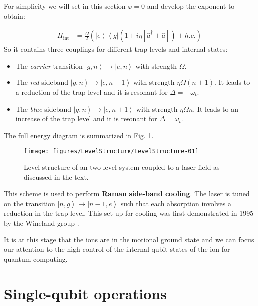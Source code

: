 \documentclass[10pt]{article}
\let\cite\citep
\providecommand\citep{\cite}
\newcommand{\bra}[1]{\ensuremath{\left\langle#1\right|}}
\newcommand{\ket}[1]{\ensuremath{\left|#1\right\rangle}}
\begin{document}
For simplicity we will set in this section $\varphi=0$ and develop the exponent to obtain:

\begin{align}
H_\textrm{int} &= \frac{\Omega}{2}\left(\ket{e}\bra{g}\left(1 + i\eta[\hat{a}^\dag+ \hat{a}]\right) + h.c.\right)
\end{align}
So it contains three couplings for different trap levels and internal states:
\begin{itemize}
\item The \textit{carrier} transition $\ket{g,n}\rightarrow \ket{e,n}$ with strength $\Omega$.
\item The \textit{red} sideband $\ket{g,n}\rightarrow \ket{e,n-1}$ with strength $\eta \Omega(n+1)$. It leads to a reduction of the trap level and it is resonant for $\Delta = -\omega_t$.
\item The \textit{blue} sideband $\ket{g,n}\rightarrow \ket{e,n+1}$ with strength $\eta \Omega n$. It leads to an increase of the trap level and it is resonant for $\Delta = \omega_t$.
\end{itemize}
The full energy diagram is summarized in Fig. \ref{226851}.
\begin{figure}[h!]
\begin{center}
\texttt{[image: figures/LevelStructure/LevelStructure-01]}
\caption{{Level structure of an two-level system coupled to a laser field as
discussed in the text.
{\label{226851}}%
}}
\end{center}
\end{figure}

This scheme is used to perform \textbf{Raman side-band cooling}. The laser is tuned on the transition $\ket{n,g}\rightarrow \ket{n-1,e}$ such that each absorption involves a reduction in the trap level. This set-up for cooling was first demonstrated in 1995 by the Wineland group \cite{Monroe_1995}.

It is at this stage that the ions are in the motional ground state and we can focus our attention to the high control of the internal qubit states of the ion for quantum computing.

\section{Single-qubit operations}
\end{document}
